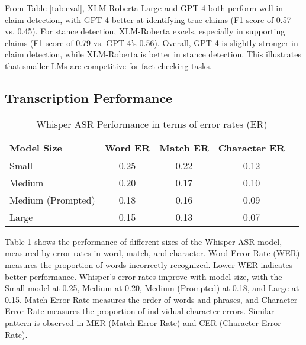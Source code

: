 From Table \ref{tab:eval}, XLM-Roberta-Large  and GPT-4 both perform well in claim detection, with GPT-4 better at identifying true claims (F1-score of 0.57 vs. 0.45). For stance detection, XLM-Roberta excels, especially in supporting claims (F1-score of 0.79 vs. GPT-4’s 0.56). Overall, GPT-4 is slightly stronger in claim detection, while XLM-Roberta is better in stance detection. This illustrates that smaller LMs are competitive for fact-checking tasks.



\subsection{Transcription Performance}



\begin{table}[h!!]
\centering
\caption{Whisper ASR Performance in terms of error rates (ER)}
\label{tab:asr}
\begin{tabular}{lcccc}
\toprule
       Model Size &  Word ER &  Match ER &  Character ER \\
\midrule
            Small &                   0.25 &                    0.22 &                        0.12  \\
           Medium &                   0.20 &                    0.17 &                        0.10  \\
Medium (Prompted) &                   0.18 &                    0.16 &                        0.09  \\
            Large &                   0.15 &                    0.13 &                        0.07 \\
\bottomrule
\end{tabular}
\end{table}


Table \ref{tab:asr} shows the performance of different sizes of the Whisper ASR model, measured by error rates in word, match, and character. Word Error Rate (WER)  measures the proportion of words incorrectly recognized. Lower WER indicates better performance. Whisper’s error rates improve with model size, with the Small model at 0.25, Medium at 0.20, Medium (Prompted) at 0.18, and Large at 0.15. Match Error Rate measures the order of words and phrases, and Character Error Rate measures the  proportion of individual character errors. Similar pattern is observed in MER (Match Error Rate) and CER (Character Error Rate).
